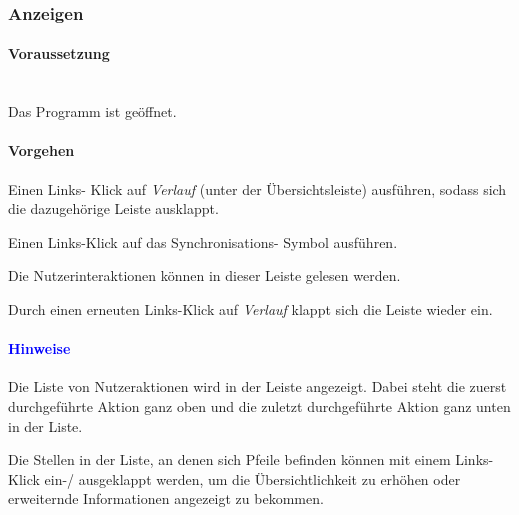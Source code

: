 \documentclass[enabledeprecatedfontcommands,fontsize=11pt,paper=a4,twoside]{scrartcl}
\newcounter{one}
\newcounter{two}[one]
\newcommand*{\hint}{\paragraph{\textcolor{blue}{Hinweise}}}
\newcommand*{\condition}{\paragraph{Voraussetzung}$\;$ \vspace{0.2cm}\\}
\newcommand*{\action}{\paragraph{Vorgehen}}
\let\tempone\itemize
\let\temptwo\enditemize
\renewenvironment{itemize}{\tempone\addtolength{\itemsep}{-10.0pt}}{\temptwo}
\let\origenumerate\enumerate
\let\origendenumerate\endenumerate
\renewenvironment{enumerate}{\origenumerate \addtolength{\itemsep}{-10.0pt}}{\origendenumerate}
\begin{document}
\subsubsection{Anzeigen}
	\condition 
		Das Programm ist geöffnet.
	\action
	\begin{enumerate}
		\item Einen Links- Klick auf \textit{Verlauf} (unter der Übersichtsleiste) ausführen, sodass sich die dazugehörige Leiste ausklappt.
		\item Einen Links-Klick auf das Synchronisations- Symbol ausführen.
		\item Die Nutzerinteraktionen können in dieser Leiste gelesen werden. 
		\item Durch einen erneuten Links-Klick auf \textit{Verlauf} klappt sich die Leiste wieder ein.
	\end{enumerate} 
	\hint
	\begin{itemize}
		\item Die Liste von Nutzeraktionen wird in der Leiste angezeigt. Dabei steht die zuerst durchgeführte Aktion ganz oben und die zuletzt durchgeführte Aktion ganz unten in der Liste.
		\item Die Stellen in der Liste, an denen sich Pfeile befinden können mit einem Links-Klick ein-/ ausgeklappt werden, um die Übersichtlichkeit zu erhöhen oder erweiternde Informationen angezeigt zu bekommen. 
	\end{itemize}

\end{document}
